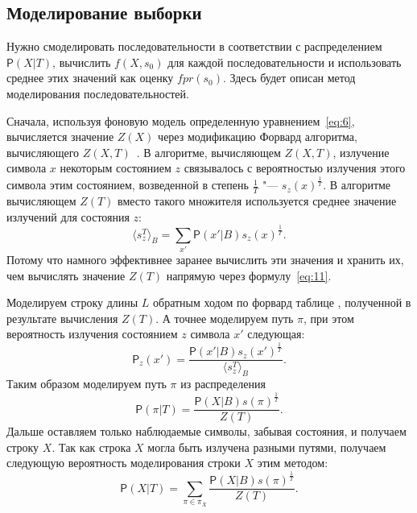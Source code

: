 \documentclass[specialist,
substylefile = spbu_report.rtx,
subf,href,colorlinks=true, 12pt]{disser}
\begin{document}
			\subsection{Моделирование выборки}
				Нужно смоделировать последовательности в соответствии с распределением $\mathsf{P}(X|T)$, вычислить $f(X, s_{0})$ для каждой последовательности и использовать среднее этих значений как оценку $fpr(s_{0})$. Здесь будет описан метод моделирования последовательностей.
				
				Сначала, используя фоновую модель определенную уравнением~\eqref{eq:6}, вычисляется значение $Z(X)$ через модификацию Форвард алгоритма, вычисляющего $Z(X,T)$~\cite{Newberg2009}. В алгоритме, вычисляющем $Z(X,T)$, излучение символа $x$ некоторым состоянием $z$ связывалось с вероятностью излучения этого символа этим состоянием, возведенной в степень $\frac{1}{T}$ "--- $s_{z}(x)^{\frac{1}{T}}$. В алгоритме вычисляющем $Z(T)$ вместо такого множителя используется среднее значение излучений для состояния $z$:
				\begin{equation*}
					\langle s_{z}^{T} \rangle_{B} = \sum_{x'}\mathsf{P}(x'|B)s_{z}(x)^{\frac{1}{T}}. 
					\label{eq:13}
				\end{equation*}					
				Потому что намного эффективнее заранее вычислить эти значения и хранить их, чем вычислять значение $Z(T)$ напрямую через формулу~\eqref{eq:11}.
				
				Моделируем строку длины $L$ обратным ходом по форвард таблице \cite{Compeau2015a}, полученной в результате вычисления $Z(T)$. А точнее моделируем путь $\pi$, при этом вероятность излучения состоянием $z$ символа $x'$ следующая:
				\begin{equation*}
					\mathsf{P}_{z}(x') = \frac{\mathsf{P}(x'|B)s_{z}(x')^{\frac{1}{T}}} {\langle s_{z}^{T} \rangle_{B}}. 
					\label{eq:14}
				\end{equation*}			
				Таким образом моделируем путь $\pi$ из распределения 
				\begin{equation*}
					\mathsf{P}(\pi|T) = \frac{\mathsf{P}(X|B)s(\pi)^{\frac{1}{T}}}{Z(T)}. 
					\label{eq:15}
				\end{equation*}
				Дальше оставляем только наблюдаемые символы, забывая состояния, и получаем строку $X$. Так как строка $X$ могла быть излучена разными путями, получаем следующую вероятность моделирования строки $X$ этим методом:
				\begin{equation*}				
					\mathsf{P}(X|T) = \sum_{\pi \in \pi_{X}} \frac{\mathsf{P}(X|B)s(\pi)^{\frac{1}{T}}}{Z(T)}. 
					\label{eq:16}
				\end{equation*}	
			
\end{document}

